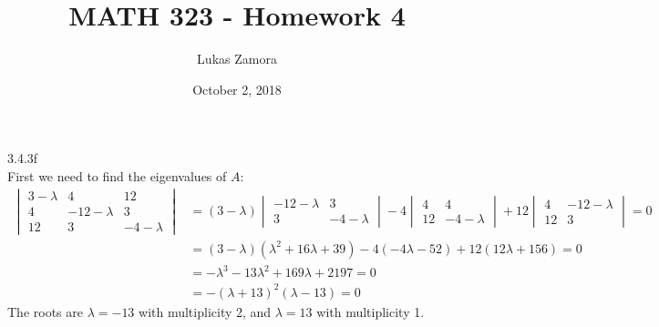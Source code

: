 \documentclass{article}
\title{MATH 323 - Homework 4}
\author{Lukas Zamora}
\date{October 2, 2018}
\theoremstyle{definition}
\begin{document}
    \maketitle
    
    \begin{prob}{3.4.3f} $  $ \vspace{1mm} \\
    	First we need to find the eigenvalues of $ A $:
    		\begin{align*}
    			\begin{vmatrix} 3-\lambda & 4 & 12 \\ 4 & -12-\lambda & 3 \\ 12 & 3 & -4-\lambda \end{vmatrix} &= (3-\lambda) \begin{vmatrix} -12-\lambda & 3 \\ 3 & -4-\lambda \end{vmatrix} -4 \begin{vmatrix} 4 & 4 \\ 12 & -4-\lambda \end{vmatrix} + 12 \begin{vmatrix} 4 & -12-\lambda \\ 12 & 3 \end{vmatrix} = 0 \\
    			&= (3-\lambda)(\lambda^2 + 16\lambda + 39) -4(-4\lambda - 52) + 12(12\lambda + 156) = 0 \\
    			&= -\lambda^3 - 13\lambda^2 + 169\lambda + 2197 = 0 \\
    			&= -(\lambda + 13)^2 (\lambda-13) = 0
    		\end{align*}
    	The roots are $ \lambda = -13 $ with multiplicity 2, and $ \lambda = 13 $ with multiplicity 1.\\
    		

\end{prob}
\end{document}
